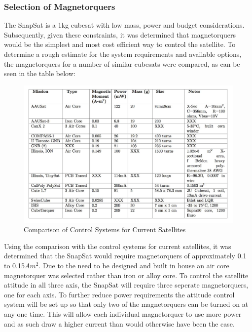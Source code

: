 \subsubsection{Selection of Magnetorquers}
The SnapSat is a 1kg cubesat with low mass, power and budget considerations. Subsequently, given these constraints, it was determined that magnetorquers would be the simplest and most cost efficient way to control the satellite.  To determine a rough estimate for the system requirements and available options, the magnetorquers for a number of similar cubesats were compared, as can be seen in the table below:\\
\vspace{-6mm}
\begin{center}
    \begin{figure}[H]
        \caption{Comparison of Control Systems for Current Satellites \cite{Miller}}
        \vspace{-4mm}
        \centering
        \includegraphics[scale = 0.4]{./figures/Magnetic_Moment}
    \end{figure}
\end{center}
\vspace{-5mm}
Using the comparison with the control systems for current satellites, it was determined that the SnapSat would require magnetorquers of approximately 0.1 to 0.15$Am^2$.  Due to the need to be designed and built in house an air core magnetorquer was selected rather than iron or alloy core.  To control the satellite attitude in all three axis, the SnapSat will require three seperate magnetorquers, one for each axis.  To further reduce power requirements the attitude control system will be set up so that only two of the magnetorquers can be turned on at any one time.  This will allow each individual magnetorquer to use more power and as such draw a higher current than would otherwise have been the case. 
